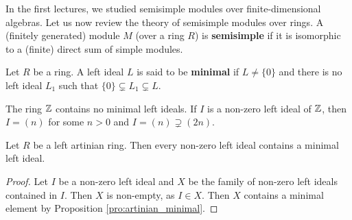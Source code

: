 

In the first lectures, we studied semisimple modules over finite-dimensional 
algebras. Let us now review the theory of semisimple modules over rings. 
A (finitely generated) module $M$ (over a ring $R$) is \textbf{semisimple} 
if it is isomorphic to a (finite) direct sum of simple modules. 

\begin{definition}
    Let $R$ be a ring. A left ideal $L$ is said to be \textbf{minimal}
    if $L\ne\{0\}$ and there is no left ideal $L_1$
    such that $\{0\}\subsetneq L_1\subsetneq L$.
\end{definition}

The ring $\mathbb{Z}$ contains no minimal left ideals. If $I$ is a non-zero 
left ideal of $\mathbb{Z}$, then
$I=(n)$ for some $n>0$ and $I=(n)\supsetneq (2n)$. 

\begin{proposition}
    Let $R$ be a left artinian ring. 
    Then every non-zero left ideal contains a minimal left ideal. 
\end{proposition}

\begin{proof}
    Let $I$ be a non-zero left ideal and 
    $X$ be the family of non-zero left ideals contained in $I$. Then $X$ is non-empty, as 
    $I\in X$. Then $X$ contains a minimal element by Proposition \ref{pro:artinian_minimal}. 
\end{proof}




